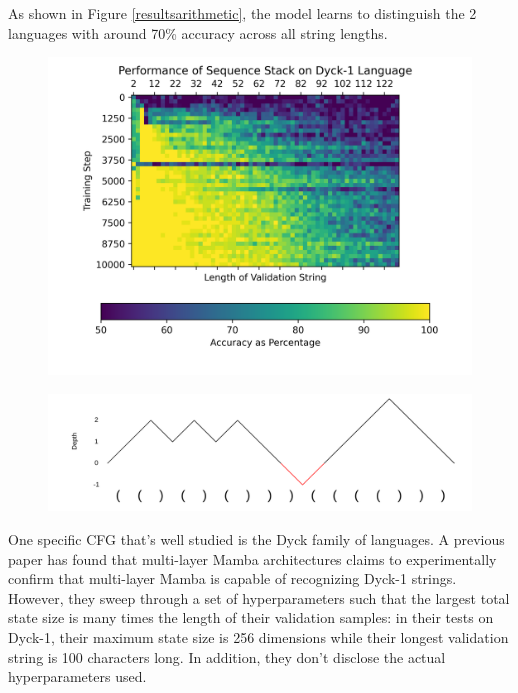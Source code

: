 As shown in Figure \ref{resultsarithmetic}, the model learns to distinguish the
2 languages with around 70\% accuracy across all string lengths.

\begin{figure}
    \includegraphics[width=\textwidth]{figures/dyck.png}
    \caption{}
    \label{resultsdyck}
\end{figure}
\begin{figure}
    \includegraphics[width=\textwidth]{figures/dyck_challenge.pdf}
    \caption{}
    \label{dyckchallenge}
\end{figure}

One specific CFG that's well studied is the Dyck family of languages.
A previous paper\cite{ssmformal} has found that multi-layer Mamba architectures
claims to experimentally confirm that multi-layer Mamba is capable of
recognizing Dyck-1 strings. However, they sweep through a set of hyperparameters
such that the largest total state size is many times the length of their
validation samples: in their tests on Dyck-1, their maximum state size is 256
dimensions while their longest validation string is 100 characters long.
In addition, they don't disclose the actual hyperparameters used.

